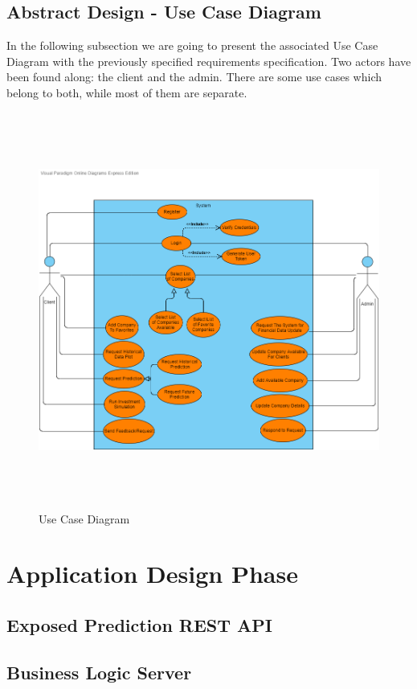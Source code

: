 \subsection{Abstract Design - Use Case Diagram}
In the following subsection we are going to present the associated Use Case Diagram with the previously specified requirements specification. Two actors have been found along: the client and the admin. There are some use cases which belong to both, while most of them are separate.

\begin{figure}[H]
\centering
\includegraphics[height=13cm]{images/UseCaseDiagram.png} 
\caption{Use Case Diagram}
\label{fig:usecasediagram}
\end{figure}


\section{Application Design Phase}

\subsection{Exposed Prediction REST API}

\subsection{Business Logic Server}


